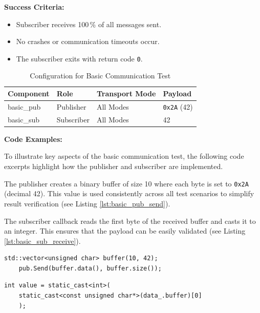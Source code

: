 \textbf{Success Criteria:}
\begin{itemize}
	\item Subscriber receives 100\,\% of all messages sent.
	\item No crashes or communication timeouts occur.
	\item The subscriber exits with return code \texttt{0}.
\end{itemize}

\begin{table}[H]
	\centering
	\begin{tabular}{@{}llll@{}}
		\toprule
		\textbf{Component} & \textbf{Role} & \textbf{Transport Mode} & \textbf{Payload} \\
		\midrule
		basic\_pub  & Publisher  & All Modes  & \texttt{0x2A} (42) \\
		basic\_sub  & Subscriber & All Modes  & 42 \\
		\bottomrule
	\end{tabular}
	\caption{Configuration for Basic Communication Test}
	\captionsetup{position=bottom}
	\label{tab:basic_comm_test}
\end{table}


\textbf{Code Examples:}

\vspace{0.4em}
To illustrate key aspects of the basic communication test, the following code excerpts highlight how the publisher and subscriber are implemented.

\vspace{1em}
The publisher creates a binary buffer of size 10 where each byte is set to \texttt{0x2A} (decimal 42). This value is used consistently across all test scenarios to simplify result verification (see Listing \ref{lst:basic_pub_send}).

\vspace{1em}
The subscriber callback reads the first byte of the received buffer and casts it to an integer. This ensures that the payload can be easily validated (see Listing \ref{lst:basic_sub_receive}).
\vspace{0.5em}

\begin{lstlisting}[style=cppstyle, caption={Binary buffer with value 42 used by the publisher}, label={lst:basic_pub_send}, captionpos=b]
	std::vector<unsigned char> buffer(10, 42);
	pub.Send(buffer.data(), buffer.size());
\end{lstlisting}

\begin{lstlisting}[style=cppstyle, caption={Extracting first byte from the received message in subscriber}, label={lst:basic_sub_receive}, captionpos=b]
	int value = static_cast<int>(
	static_cast<const unsigned char*>(data_.buffer)[0]
	);
\end{lstlisting}

